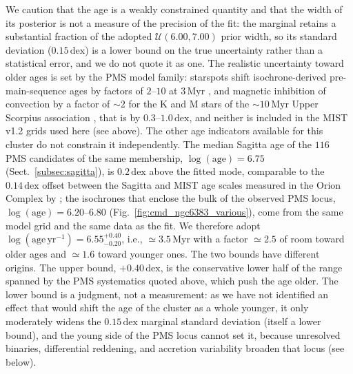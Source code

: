 \documentclass{aa}
\begin{document}
We caution that the age is a weakly constrained quantity and that the width of its posterior is not a measure of the precision of the fit: the marginal retains a substantial fraction of the adopted $\mathcal{U}(6.00,7.00)$ prior width, so its standard deviation ($0.15\,\mathrm{dex}$) is a lower bound on the true uncertainty rather than a statistical error, and we do not quote it as one. The realistic uncertainty toward older ages is set by the PMS model family: starspots shift isochrone-derived pre-main-sequence ages by factors of $2$--$10$ at $3\,\mathrm{Myr}$ \citep{2015ApJ...807..174S}, and magnetic inhibition of convection by a factor of $\sim2$ for the K and M stars of the $\sim10\,\mathrm{Myr}$ Upper Scorpius association \citep{2016A&A...593A..99F}, that is by $0.3$--$1.0\,\mathrm{dex}$, and neither is included in the MIST v1.2 grids used here (see above). The other age indicators available for this cluster do not constrain it independently. The median Sagitta age of the $116$ PMS candidates of the same membership, $\log(\mathrm{age})=6.75$ (Sect.~\ref{subsec:sagitta}), is $0.2\,\mathrm{dex}$ above the fitted mode, comparable to the $0.14\,\mathrm{dex}$ offset between the Sagitta and MIST age scales measured in the Orion Complex by \citet{2023AJ....165..182K}; the isochrones that enclose the bulk of the observed PMS locus, $\log(\mathrm{age})=6.20$--$6.80$ (Fig.~\ref{fig:cmd_ngc6383_various}), come from the same model grid and the same data as the fit. We therefore adopt $\log(\mathrm{age}\,\mathrm{yr^{-1}}) = 6.55^{+0.40}_{-0.20}$, i.e., $\simeq3.5\,\mathrm{Myr}$ with a factor $\simeq2.5$ of room toward older ages and $\simeq1.6$ toward younger ones. The two bounds have different origins. The upper bound, $+0.40\,\mathrm{dex}$, is the conservative lower half of the range spanned by the PMS systematics quoted above, which push the age older. The lower bound is a judgment, not a measurement: as we have not identified an effect that would shift the age of the cluster as a whole younger, it only moderately widens the $0.15\,\mathrm{dex}$ marginal standard deviation (itself a lower bound), and the young side of the PMS locus cannot set it, because unresolved binaries, differential reddening, and accretion variability broaden that locus (see below).
\end{document}
